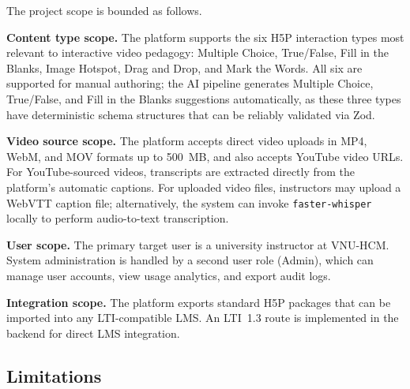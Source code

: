 The project scope is bounded as follows.

\textbf{Content type scope.} The platform supports the six H5P interaction
types most relevant to interactive video pedagogy: Multiple Choice,
True/False, Fill in the Blanks, Image Hotspot, Drag and Drop, and Mark the
Words. All six are supported for manual authoring; the AI pipeline generates
Multiple Choice, True/False, and Fill in the Blanks suggestions
automatically, as these three types have deterministic schema structures
that can be reliably validated via Zod.

\textbf{Video source scope.} The platform accepts direct video uploads in
MP4, WebM, and MOV formats up to 500~MB, and also accepts YouTube video
URLs. For YouTube-sourced videos, transcripts are extracted directly from
the platform's automatic captions. For uploaded video files, instructors may
upload a WebVTT caption file; alternatively, the system can invoke
\texttt{faster-whisper} locally to perform audio-to-text transcription.

\textbf{User scope.} The primary target user is a university instructor at
VNU-HCM. System administration is handled by a second user role (Admin),
which can manage user accounts, view usage analytics, and export audit logs.

\textbf{Integration scope.} The platform exports standard H5P packages that
can be imported into any LTI-compatible LMS. An LTI~1.3 route is
implemented in the backend for direct LMS integration.

\subsection{Limitations}

